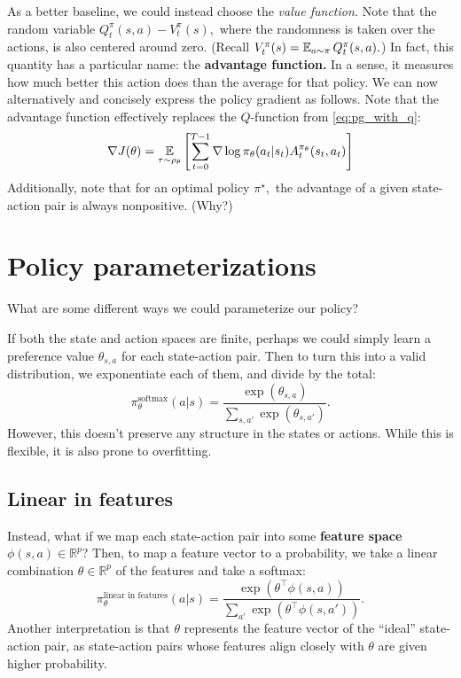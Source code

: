 \documentclass[\main/main]{subfiles}
\begin{document}
As a better baseline, we could instead choose the \emph{value function.} Note that the random variable $Q^\pi_t(s, a) - V^\pi_t(s),$ where the randomness is taken over the actions,
is also centered around zero. (Recall $V^\pi_t(s) = \operatorname*{\mathbb{E}}_{a \sim \pi} Q^\pi_t(s, a).$) In fact, this quantity has a particular name: the \textbf{advantage function.} In a sense, it measures how much better this action does than the average for that policy.
We can now alternatively and concisely express the policy gradient as follows. Note that the advantage function effectively replaces the $Q$-function from \autoref{eq:pg_with_q}: \[
    \nabla J(\theta) = \operatorname*{\mathbb{E}}_{\tau \sim \rho_\theta} \left[
        \sum_{t=0}^{T-1} \nabla \log \pi_\theta(a_t | s_t) A^{\pi_\theta}_t (s_t, a_t)
    \right]
\]
Additionally, note that for an optimal policy $\pi^\star,$ the advantage of a given state-action pair is always nonpositive. (Why?)


\section{Policy parameterizations} \label{sec:parameterizations}

What are some different ways we could parameterize our policy?

If both the state and action spaces are finite, perhaps we could simply learn a preference value $\theta_{s,a}$ for each state-action pair. Then to turn this into a valid distribution, we exponentiate each of them, and divide by the total: \[
    \pi^\text{softmax}_\theta(a | s) = \frac{\exp(\theta_{s,a})}{\sum_{s,a'} \exp (\theta_{s,a'})}.
\]
However, this doesn't preserve any structure in the states or actions. While this is flexible, it is also prone to overfitting.

\subsection{Linear in features}

Instead, what if we map each state-action pair into some \textbf{feature space} $\phi(s, a) \in \mathbb{R}^p$? Then, to map a feature vector to a probability,
we take a linear combination $\theta \in \mathbb{R}^p$ of the features and take a softmax: \[
    \pi^\text{linear in features}_{\theta}(a|s) = \frac{\exp(\theta^\top \phi(s, a))}{\sum_{a'} \exp(\theta^\top \phi(s, a'))}.
\]
Another interpretation is that $\theta$ represents the feature vector of the ``ideal'' state-action pair, as state-action pairs whose features align closely with $\theta$ are given higher probability.
\end{document}
